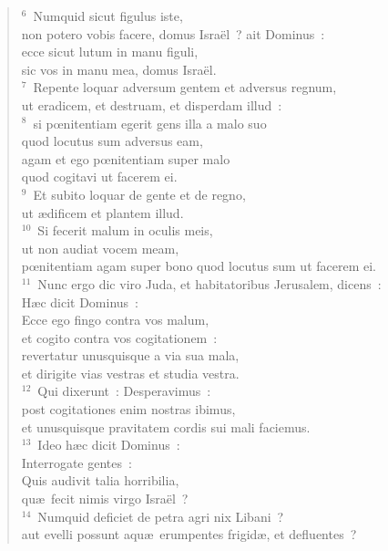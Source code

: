 \begin{flushleft}\begin{verse}${}^{6}$~Numquid sicut figulus iste,\\ non potero vobis facere, domus Isra\"el~? ait Dominus~:\\ ecce sicut lutum in manu figuli,\\ sic vos in manu mea, domus Isra\"el.\\
${}^{7}$~Repente loquar adversum gentem et adversus regnum,\\ ut eradicem, et destruam, et disperdam illud~:\\
${}^{8}$~si pœnitentiam egerit gens illa a malo suo\\ quod locutus sum adversus eam,\\ agam et ego pœnitentiam super malo\\ quod cogitavi ut facerem ei.\\
${}^{9}$~Et subito loquar de gente et de regno,\\ ut \ae dificem et plantem illud.\\
${}^{10}$~Si fecerit malum in oculis meis,\\ ut non audiat vocem meam,\\ pœnitentiam agam super bono quod locutus sum ut facerem ei.\\
${}^{11}$~Nunc ergo dic viro Juda, et habitatoribus Jerusalem, dicens~:\\ H\ae c dicit Dominus~:\\ Ecce ego fingo contra vos malum,\\ et cogito contra vos cogitationem~:\\ revertatur unusquisque a via sua mala,\\ et dirigite vias vestras et studia vestra.\\
${}^{12}$~Qui dixerunt~: Desperavimus~:\\ post cogitationes enim nostras ibimus,\\ et unusquisque pravitatem cordis sui mali faciemus.\\
${}^{13}$~Ideo h\ae c dicit Dominus~:\\ Interrogate gentes~:\\ Quis audivit talia horribilia,\\ qu\ae\ fecit nimis virgo Isra\"el~?\\
${}^{14}$~Numquid deficiet de petra agri nix Libani~?\\ aut evelli possunt aqu\ae\ erumpentes frigid\ae , et defluentes~?\\

\end{verse}
\end{flushleft}
